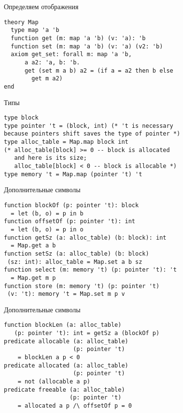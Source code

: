 \documentclass[hyperref={unicode=true}]{beamer}
\begin{document}
    \begin{frame}[fragile]{Определяем отображения}
    \begin{lstlisting}
theory Map
  type map 'a 'b
  function get (m: map 'a 'b) (v: 'a): 'b
  function set (m: map 'a 'b) (v: 'a) (v2: 'b)
  axiom get_set: forall m: map 'a 'b,
      a a2: 'a, b: 'b.
      get (set m a b) a2 = (if a = a2 then b else
        get m a2)
end
    \end{lstlisting}
    \end{frame}

    \begin{frame}[fragile]{Типы}
    \begin{lstlisting}
type block
type pointer 't = (block, int) (* 't is necessary
because pointers shift saves the type of pointer *)
type alloc_table = Map.map block int
(* alloc_table[block] >= 0 -- block is allocated
   and here is its size;
   alloc_table[block] < 0 -- block is allocable *)
type memory 't = Map.map (pointer 't) 't
    \end{lstlisting}
    \end{frame}

    \begin{frame}[fragile]{Дополнительные символы}
    \begin{lstlisting}
function blockOf (p: pointer 't): block
  = let (b, o) = p in b
function offsetOf (p: pointer 't): int
  = let (b, o) = p in o
function getSz (a: alloc_table) (b: block): int
  = Map.get a b
function setSz (a: alloc_table) (b: block)
 (sz: int): alloc_table = Map.set a b sz
function select (m: memory 't) (p: pointer 't): 't
  = Map.get m p
function store (m: memory 't) (p: pointer 't)
 (v: 't): memory 't = Map.set m p v
    \end{lstlisting}
    \end{frame}

    \begin{frame}[fragile]{Дополнительные символы}
    \begin{lstlisting}
function blockLen (a: alloc_table)
   (p: pointer 't): int = getSz a (blockOf p)
predicate allocable (a: alloc_table)
                    (p: pointer 't)
    = blockLen a p < 0
predicate allocated (a: alloc_table)
                    (p: pointer 't)
    = not (allocable a p)
predicate freeable (a: alloc_table)
                   (p: pointer 't)
    = allocated a p /\ offsetOf p = 0
    \end{lstlisting}
    \end{frame}
\end{document}
